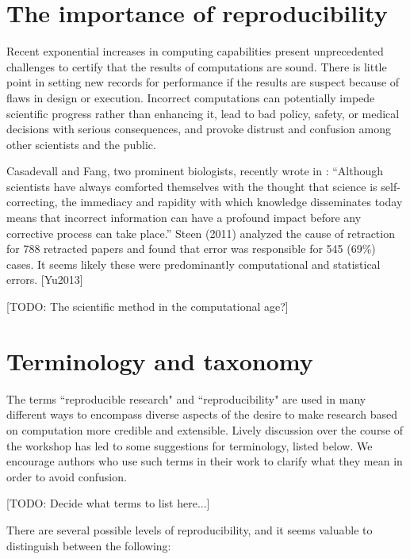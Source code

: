 \documentclass[11pt]{article}
\newcommand{\todo}[1]{{\color{red} [TODO: #1]}}
\newcommand{\todo}[1]{}
\begin{document}
\section{The importance of reproducibility} \label{sec:importance}

Recent exponential increases in computing
capabilities present unprecedented challenges to certify
that the results of computations are sound.  There is little point
in setting new records for performance if the results are suspect
because of flaws in design or execution.  Incorrect computations
can potentially impede scientific progress rather than enhancing
it, lead to bad policy, safety, or medical decisions with serious
consequences, and provoke distrust and confusion among other
scientists and the public.


Casadevall and Fang, two prominent biologists, recently wrote in \cite{??}: 
``Although
scientists have always comforted themselves with the thought that science is
self-correcting, the immediacy and rapidity with which knowledge
disseminates today means that incorrect information can have a profound
impact before any corrective process can take place.'' Steen (2011) analyzed
the cause of retraction for 788 retracted papers and found that error was
responsible for 545 (69\%) cases. It seems likely these were predominantly
computational and statistical errors. [Yu2013]


\todo{The scientific method in the computational age?}

\section{Terminology and taxonomy} \label{sec:taxonomy}

The terms ``reproducible research" and ``reproducibility" are used in many
different ways to encompass diverse aspects of the desire to make research
based on computation more credible and extensible.  Lively discussion over
the course of the workshop has led to some suggestions for terminology,
listed below.  We encourage authors who use such
terms in their work to clarify what they mean in order to avoid confusion. 

\todo{Decide what terms to list here...}

There are several possible levels of reproducibility, and it seems valuable
to distinguish between the following:
\end{document}
